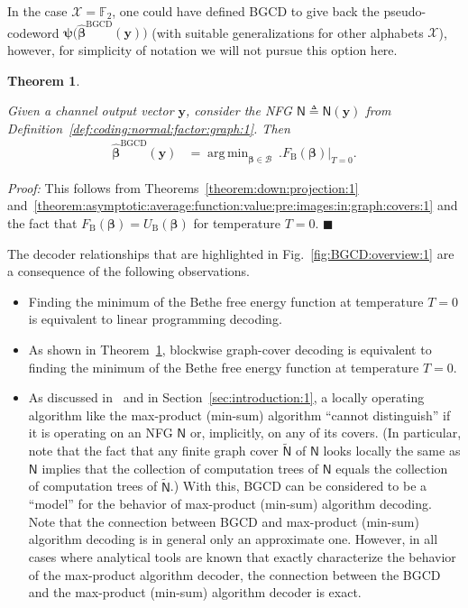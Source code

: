 \documentclass[journal, twocolumn]{IEEEtran}
\renewcommand{\mathbf}[1]{{\bm{#1}}}
\newcommand{\vect}[1]{\mathbf{#1}}
\newcommand{\set}[1]{\mathcal{#1}}
\newcommand{\graph}[1]{\mathsf{#1}}
\DeclareMathOperator*{\argmin}{arg\,min}
\newcommand{\GF}[1]{\mathbb{F}_{#1}}
\newcommand{\defeq}{\triangleq}
\newcommand{\bel}{\beta}
\newcommand{\vbel}{\boldsymbol{\bel}}
\newcommand{\hvbel}{\boldsymbol{\hat \bel}}
\newcommand{\setX}{\set{X}}
\newcommand{\BGCD}{\mathrm{BGCD}}
\newcommand{\vy}{\vect{y}}
\newcommand{\lmpB}{\mathcal{B}}
\newcommand{\graphN}{\graph{N}}
\newcommand{\FBethe}{F_{\mathrm{B}}}
\newcommand{\UBethe}{U_{\mathrm{B}}}
\newcommand{\cover}[1]{\tilde{#1}}
\newcommand{\cgraph}[1]{\cover{\graph{#1}}}
\newcommand{\?}{\mathrm{?}}
\newcommand{\vpsi}{\boldsymbol{\psi}}
\newcommand{\qedblack}{\hspace*{\fill}%
  $\blacksquare$\smallskip}
\newtheorem{Theorem}[Lemma]{Theorem}
\newenvironment{Proof}%
  {\noindent \emph{Proof:}}{\qedblack}
\begin{document}
In the case $\setX = \GF{2}$, one could have defined BGCD to give back the
pseudo-codeword $\vpsi\bigl( \hvbel^{\BGCD}(\vy) \bigr)$ (with suitable
generalizations for other alphabets $\setX$), however, for simplicity of
notation we will not pursue this option here.


\begin{Theorem}
  \label{theorem:BGCD:characterization:1}

  Given a channel output vector $\vy$, consider the NFG
  $\graphN \defeq \graphN(\vy)$ from
  Definition~\ref{def:coding:normal:factor:graph:1}. Then
  \begin{align*}
    \hvbel^{\BGCD}(\vy)
      &= \argmin_{\vbel \in \lmpB} \ 
           \Big.
             \FBethe(\vbel)
           \Big|_{T = 0}.
  \end{align*}
\end{Theorem}


\begin{Proof}
  This follows from Theorems~\ref{theorem:down:projection:1}
  and~\ref{theorem:asymptotic:average:function:value:pre:images:in:graph:covers:1}
  and the fact that $\FBethe(\vbel) = \UBethe(\vbel)$ for temperature $T = 0$.
\end{Proof}


The decoder relationships that are highlighted in
Fig.~\ref{fig:BGCD:overview:1} are a consequence of the following
observations.
\begin{itemize}

\item Finding the minimum of the Bethe free energy function at temperature $T
  = 0$ is equivalent to linear programming decoding.

\item As shown in Theorem~\ref{theorem:BGCD:characterization:1}, blockwise
  graph-cover decoding is equivalent to finding the minimum of the Bethe free
  energy function at temperature $T = 0$.

\item As discussed in~\cite{Koetter:Vontobel:03:1, Vontobel:Koetter:05:1:subm}
  and in Section~\ref{sec:introduction:1}, a locally operating algorithm like
  the max-product (min-sum) algorithm ``cannot distinguish'' if it is
  operating on an NFG $\graphN$ or, implicitly, on any of its covers. (In
  particular, note that the fact that any finite graph cover $\cgraph{N}$ of
  $\graphN$ looks locally the same as $\graphN$ implies that the collection of
  computation trees of $\graphN$ equals the collection of computation trees of
  $\cgraph{N}$.) With this, BGCD can be considered to be a ``model'' for the
  behavior of max-product (min-sum) algorithm decoding. Note that the
  connection between BGCD and max-product (min-sum) algorithm decoding is in
  general only an approximate one. However, in all cases where analytical
  tools are known that exactly characterize the behavior of the max-product
  algorithm decoder, the connection between the BGCD and the max-product
  (min-sum) algorithm decoder is exact.

\end{itemize}
\end{document}
